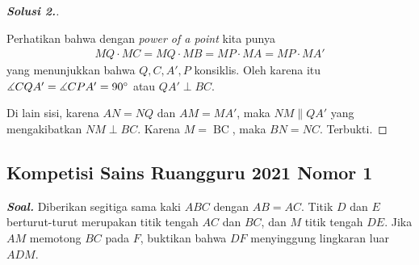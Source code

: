 \documentclass[letterpaper, 13pt]{scrartcl}
\begin{document}
\begin{proof}[\textbf{Solusi 2.}]
\begin{center}
\begin{tikzpicture}[scale=3, dot/.style={circle, fill, inner sep=0.5pt, outer sep=0pt}]
    \end{tikzpicture}
\end{center}

Perhatikan bahwa dengan \textit{power of a point} kita punya
\begin{align*}
    MQ \cdot MC = MQ \cdot MB = MP \cdot MA = MP \cdot MA'
\end{align*}
yang menunjukkan bahwa $Q,C,A',P$ konsiklis. Oleh karena itu $\measuredangle CQA' = \measuredangle CPA' = 90^\circ$ atau $QA' \perp BC$.

Di lain sisi, karena $AN=NQ$ dan $AM=MA'$, maka $NM \parallel QA'$ yang mengakibatkan $NM \perp BC$. Karena $M = \operatorname{BC}$, maka $BN=NC$. Terbukti.
\end{proof}

\subsection{Kompetisi Sains Ruangguru 2021 Nomor 1}

\textbf{\textit{Soal. }}Diberikan segitiga sama kaki $ABC$ dengan $AB=AC$. Titik $D$ dan $E$ berturut-turut merupakan titik tengah $AC$ dan $BC$, dan $M$ titik tengah $DE$. Jika $AM$ memotong $BC$ pada $F$, buktikan bahwa $DF$ menyinggung lingkaran luar $ADM$.
\end{document}
